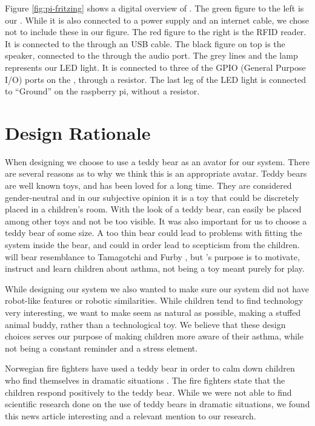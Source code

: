 Figure \ref{fig:pi-fritzing} shows a digital overview of \buddy{}. The green figure to the left is our \rpi{}. While it is also connected to a power supply and an internet cable, we chose not to include these in our figure. The red figure to the right is the RFID reader. It is connected to the \rpi{} through an USB cable. The black figure on top is the speaker, connected to the \rpi{} through the audio port. 
The grey lines and the lamp represents our LED light. It is connected to three of the GPIO (General Purpose I/O) ports on the \rpi{}, through a resistor. The last leg of the LED light is connected to ``Ground'' on the raspberry pi, without a resistor.

\section{Design Rationale}
When designing \buddy{} we choose to use a teddy bear as an avator for our system. There are several reasons as to why we think this is an appropriate avatar. Teddy bears are well known toys, and has been loved for a long time. They are considered gender-neutral \cite{stagnitti1997determining} \cite{cherney2006gender} and in our subjective opinion it is a toy that could be discretely placed in a children's room. With the look of a teddy bear, \buddy{} can easily be placed among other toys and not be too visible. It was also important for us to choose a teddy bear of some size. A too thin bear could lead to problems with fitting the system inside the bear, and could in order lead to scepticism from the children. \buddy{} will bear resemblance to Tamagotchi \cite{tamagotchi} and Furby \cite{furby}, but \buddy{}'s purpose is to motivate, instruct and learn children about asthma, not being a toy meant purely for play. 

While designing our system we also wanted to make sure our system did not have robot-like features or robotic similarities. While children tend to find technology very interesting, we want to make \buddy{} seem as natural as possible, making a stuffed animal buddy, rather than a technological toy. We believe that these design choices serves our purpose of making children more aware of their asthma, while not being a constant reminder and a stress element.

Norwegian fire fighters have used a teddy bear in order to calm down children who find themselves in dramatic situations . The fire fighters state that the children respond positively to the teddy bear. 
While we were not able to find scientific research done on the use of teddy bears in dramatic situations, we found this news article interesting and a relevant mention to our research.

